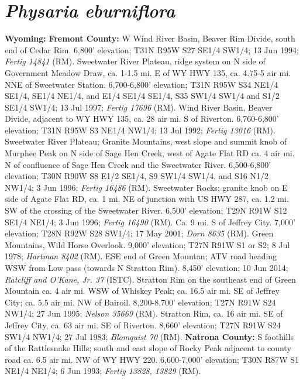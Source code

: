 \section*{\textit{Physaria eburniflora}}

  \textbf{Wyoming:}
  \textbf{Fremont County:}
W Wind River Basin, Beaver Rim Divide, south end of Cedar Rim. 6,800' elevation;
T31N R95W S27 SE1/4 SW1/4; 13 Jun 1994; \textit{Fertig 14841} (RM).
Sweetwater River Plateau, ridge system on N side of Government Meadow Draw, ca.
1-1.5 mi. E of WY HWY 135, ca. 4.75-5 air mi. NNE of Sweetwater Station.
6,700-6,800' elevation; T31N R95W S34 NE1/4 SE1/4, SE1/4 NE1/4, and
E1/4 SE1/4 SE1/4, S35 SW1/4 SW1/4 and S1/2 SE1/4 SW1/4;
13 Jul 1997; \textit{Fertig 17696} (RM).
Wind River Basin, Beaver Divide, adjacent to WY HWY 135, ca. 28 air mi. S of
Riverton. 6,760-6,800' elevation; T31N R95W S3 NE1/4 NW1/4; 13 Jul 1992;
\textit{Fertig 13016} (RM).
Sweetwater River Plateau; Granite Mountains, west slope and summit knob of
Murphee Peak on N side of Sage Hen Creek, west of Agate Flat RD ca. 4 air mi.
N of confluence of Sage Hen Creek and the Sweetwater River.
6,500-6,800' elevation; T30N R90W S8 E1/2 SE1/4, S9 SW1/4 SW1/4, and
S16 N1/2 NW1/4; 3 Jun 1996; \textit{Fertig 16486} (RM).
Sweetwater Rocks; granite knob on E side of Agate Flat RD, ca. 1 mi. NE of
junction with US HWY 287, ca. 1.2 mi. SW of the crossing of the Sweetwater River.
6,500' elevation; T29N R91W S12 SE1/4 NE1/4; 3 Jun 1996;
\textit{Fertig 16490} (RM).
Ca. 9 mi. S of Jeffrey City. 7,000' elevation; T28N R92W S28 SW1/4; 17 May 2001;
\textit{Dorn 8635} (RM).
Green Mountains, Wild Horse Overlook. 9,000' elevation; T27N R91W S1 or S2;
8 Jul 1978; \textit{Hartman 8402} (RM).
ESE end of Green Mountan; ATV road heading WSW from Low pass (towards N
Stratton Rim). 8,450' elevation; 10 Jun 2014;
\textit{Ratcliff and O'Kane, Jr. 37} (ISTC).
Stratton Rim on the southeast end of Green Mountain ca. 4 air mi. WSW of
Whiskey Peak; ca. 16.5 air mi. SE of Jeffrey City; ca. 5.5 air mi. NW of
Bairoil. 8,200-8,700' elevation; T27N R91W S24 NW1/4; 27 Jun 1995;
\textit{Nelson 35669} (RM).
Stratton Rim, ca. 16 air mi. SE of Jeffrey City, ca. 63 air mi. SE of Riverton.
8,660' elevation; T27N R91W S24 SW1/4 NW1/4; 27 Jul 1983;
\textit{Blomquist 70} (RM).
  \textbf{Natrona County:}
S foothills of the Rattlesnake Hills; south and east slope of Rocky Peak adjacent
to county road ca. 6.5 air mi. NW of WY HWY 220. 6,600-7,000' elevation;
T30N R87W S1 NE1/4 NE1/4; 6 Jun 1993; \textit{Fertig 13828, 13829} (RM).
